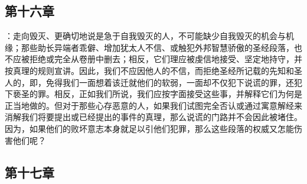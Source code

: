 \subsection{第十六章}

\par

：走向毁灭、更确切地说是急于自我毁灭的人，不可能缺少自我毁灭的机会与机缘；那些助长异端者乖僻、增加犹太人不信、或触犯外邦智慧骄傲的圣经段落，也不应被拒绝或完全从卷册中删去；相反，它们理应被虔信地接受、坚定地持守，并按真理的规则宣讲。因此，我们不应因他人的不信，而拒绝圣经所记载的先知和圣人的，即，免得我们一面想着该迁就他们的软弱，一面却不仅犯下说谎的罪，还犯下亵圣的罪。相反，正如我们所说，我们应按字面接受这些事，并解释它们为何是正当地做的。但对于那些心存恶意的人，如果我们试图完全否认或通过寓意解经来消解我们将要提出或已经提出的事件的真理，那么说谎的门路并不会因此被堵住。因为，如果他们的败坏意志本身就足以引他们犯罪，那么这些段落的权威又怎能伤害他们呢？\par


\subsection{第十七章}

\par

